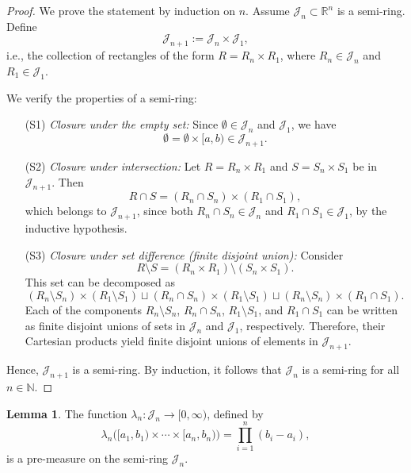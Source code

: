 \documentclass[12pt]{article}
\theoremstyle{definition}
\newtheorem{lemma}[theorem]{Lemma}
\begin{document}
\begin{proof}
We prove the statement by induction on \( n \). 
Assume \( \mathcal{J}_n \subset \mathbb{R}^n \) is a semi-ring. Define
\[
\mathcal{J}_{n+1} := \mathcal{J}_n \times \mathcal{J}_1,
\]
i.e., the collection of rectangles of the form \( R = R_n \times R_1 \), where \( R_n \in \mathcal{J}_n \) and \( R_1 \in \mathcal{J}_1 \).

We verify the properties of a semi-ring:

\begin{itemize}
    \item[(S1)] \emph{Closure under the empty set:}  
    Since \( \emptyset \in \mathcal{J}_n \) and \( \mathcal{J}_1 \), we have
    \[
    \emptyset = \emptyset \times [a, b) \in \mathcal{J}_{n+1}.
    \]

    \item[(S2)] \emph{Closure under intersection:}  
    Let \( R = R_n \times R_1 \) and \( S = S_n \times S_1 \) be in \( \mathcal{J}_{n+1} \). Then
    \[
    R \cap S = (R_n \cap S_n) \times (R_1 \cap S_1),
    \]
    which belongs to \( \mathcal{J}_{n+1} \), since both \( R_n \cap S_n \in \mathcal{J}_n \) and \( R_1 \cap S_1 \in \mathcal{J}_1 \), by the inductive hypothesis.

    \item[(S3)] \emph{Closure under set difference (finite disjoint union):}  
    Consider
    \[
    R \setminus S = (R_n \times R_1) \setminus (S_n \times S_1).
    \]
    This set can be decomposed as
    \[
    (R_n \setminus S_n) \times (R_1 \setminus S_1)
    \sqcup (R_n \cap S_n) \times (R_1 \setminus S_1)
    \sqcup (R_n \setminus S_n) \times (R_1 \cap S_1).
    \]
    Each of the components \( R_n \setminus S_n \), \( R_n \cap S_n \), \( R_1 \setminus S_1 \), and \( R_1 \cap S_1 \) can be written as finite disjoint unions of sets in \( \mathcal{J}_n \) and \( \mathcal{J}_1 \), respectively. Therefore, their Cartesian products yield finite disjoint unions of elements in \( \mathcal{J}_{n+1} \).
\end{itemize}

Hence, \( \mathcal{J}_{n+1} \) is a semi-ring. By induction, it follows that \( \mathcal{J}_n \) is a semi-ring for all \( n \in \mathbb{N} \).
\end{proof}

\medskip
\begin{lemma}
The function \( \lambda_n \colon \mathcal{J}_n \to [0, \infty) \), defined by
\[
\lambda_n\big([a_1, b_1) \times \cdots \times [a_n, b_n)\big) = \prod_{i=1}^n (b_i - a_i),
\]
is a pre-measure on the semi-ring \( \mathcal{J}_n \).
\end{lemma}
\end{document}
